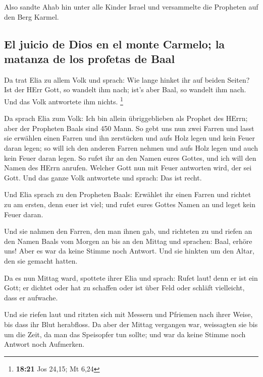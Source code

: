  Also sandte Ahab hin unter alle Kinder Israel und
versammelte die Propheten auf den Berg Karmel.

\hypertarget{el-juicio-de-dios-en-el-monte-carmelo-la-matanza-de-los-profetas-de-baal}{%
\subsection{El juicio de Dios en el monte Carmelo; la matanza de los
profetas de
Baal}\label{el-juicio-de-dios-en-el-monte-carmelo-la-matanza-de-los-profetas-de-baal}}

 Da trat Elia zu allem Volk und sprach: Wie lange hinket
ihr auf beiden Seiten? Ist der HErr Gott, so wandelt ihm nach; ist's
aber Baal, so wandelt ihm nach. Und das Volk antwortete ihm nichts.
\footnote{\textbf{18:21} Jos 24,15; Mt 6,24}

 Da sprach Elia zum Volk: Ich bin allein übriggeblieben
als Prophet des HErrn; aber der Propheten Baals sind 450 Mann.
 So gebt uns nun zwei Farren und lasst sie erwählen einen
Farren und ihn zerstücken und aufs Holz legen und kein Feuer daran
legen; so will ich den anderen Farren nehmen und aufs Holz legen und
auch kein Feuer daran legen.  So rufet ihr an den Namen
eures Gottes, und ich will den Namen des HErrn anrufen. Welcher Gott nun
mit Feuer antworten wird, der sei Gott. Und das ganze Volk antwortete
und sprach: Das ist recht.

 Und Elia sprach zu den Propheten Baals: Erwählet ihr
einen Farren und richtet zu am ersten, denn euer ist viel; und rufet
eures Gottes Namen an und leget kein Feuer daran.

 Und sie nahmen den Farren, den man ihnen gab, und
richteten zu und riefen an den Namen Baals vom Morgen an bis an den
Mittag und sprachen: Baal, erhöre uns! Aber es war da keine Stimme noch
Antwort. Und sie hinkten um den Altar, den sie gemacht hatten.

 Da es nun Mittag ward, spottete ihrer Elia und sprach:
Rufet laut! denn er ist ein Gott; er dichtet oder hat zu schaffen oder
ist über Feld oder schläft vielleicht, dass er aufwache.

 Und sie riefen laut und ritzten sich mit Messern und
Pfriemen nach ihrer Weise, bis dass ihr Blut herabfloss. 
Da aber der Mittag vergangen war, weissagten sie bis um die Zeit, da man
das Speisopfer tun sollte; und war da keine Stimme noch Antwort noch
Aufmerken.

